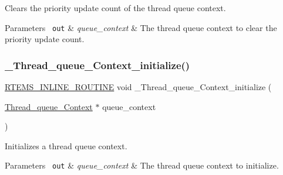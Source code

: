 Clears the priority update count of the thread queue context. 


\begin{DoxyParams}[1]{Parameters}
\mbox{\texttt{ out}}  & {\em queue\+\_\+context} & The thread queue context to clear the priority update count. \\
\hline
\end{DoxyParams}
\mbox{\label{group__RTEMSScoreThreadQueue_gae18ee06777084a67d286d743355d47ac}} 
\subsubsection{\texorpdfstring{\_Thread\_queue\_Context\_initialize()}{\_Thread\_queue\_Context\_initialize()}}
{\footnotesize\ttfamily \mbox{\hyperlink{group__RTEMSScoreBaseDefs_gac216239df231d5dbd15e3520b0b9313f}{R\+T\+E\+M\+S\+\_\+\+I\+N\+L\+I\+N\+E\+\_\+\+R\+O\+U\+T\+I\+NE}} void \+\_\+\+Thread\+\_\+queue\+\_\+\+Context\+\_\+initialize (\begin{DoxyParamCaption}\item[{\mbox{\hyperlink{structThread__queue__Context}{Thread\+\_\+queue\+\_\+\+Context}} $\ast$}]{queue\+\_\+context }\end{DoxyParamCaption})}



Initializes a thread queue context. 


\begin{DoxyParams}[1]{Parameters}
\mbox{\texttt{ out}}  & {\em queue\+\_\+context} & The thread queue context to initialize. \\
\hline
\end{DoxyParams}
\mbox{\label{group__RTEMSScoreThreadQueue_ga0adb6adf8dfbbf4836b243b805cdcf51}} 
